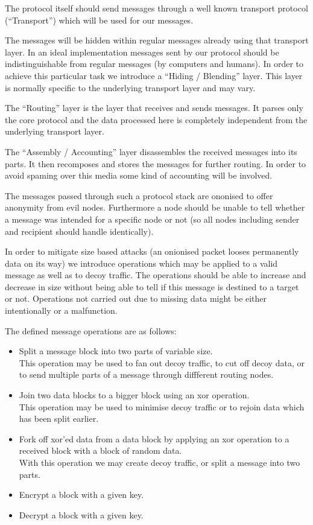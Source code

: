 The protocol itself should send messages through a well known transport protocol (``Transport'') which will be used for our messages. 

The messages will be hidden within regular messages already using that transport layer. In an ideal implementation messages sent by our protocol should be indistinguishable from regular messages (by computers and humans). In order to achieve this particular task we introduce a ``Hiding / Blending'' layer. This layer is normally specific to the underlying transport layer and may vary.

The ``Routing'' layer is the layer that receives and sends messages. It parses only the core protocol and the data processed here is completely independent from the underlying transport layer.

The ``Assembly / Accounting'' layer disassembles the received messages into its parts. It then recomposes and stores the messages for further routing. In order to avoid spaming over this media some kind of accounting will be involved. 

The messages passed through such a protocol stack are ononised to offer anonymity from evil nodes. Furthermore a node should be unable to tell whether a message was intended for a specific node or not (so all nodes including sender and recipient should handle identically).

In order to mitigate size based attacks (an onionised packet looses permanently data on its way) we introduce operations which may be applied to a valid message as well as to decoy traffic. The operations should be able to increase and decrease in size without being able to tell if this message is destined to a target or not. Operations not carried out due to missing data might be either intentionally or a malfunction.

The defined message operations are as follows:
\begin{itemize}
	\item Split a message block into two parts of variable size.\\
	This operation may be used to fan out decoy traffic, to cut off decoy data, or to send multiple parts of a message through diffferent routing nodes.
	\item Join two data blocks to a bigger block using an xor operation.\\
	This operation may be used to minimise decoy traffic or to rejoin data which has been split earlier.
	\item Fork off xor'ed data from a data block by applying an xor operation to a received block with a block of random data.\\
	With this operation we may create decoy traffic, or split a message into two parts.
	\item Encrypt a block with a given key.      
	\item Decrypt a block with a given key.
\end{itemize}

